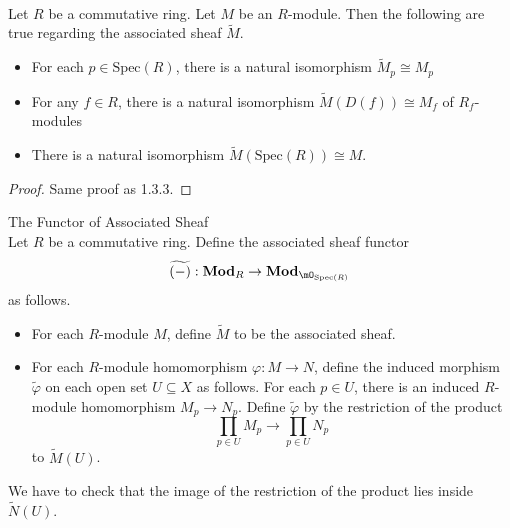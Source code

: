 \documentclass[a4paper]{article}
\begin{document}
\begin{prp}{}{}\\
Let $R$ be a commutative ring. Let $M$ be an $R$-module. Then the following are true regarding the associated sheaf $\widetilde{M}$. 
\begin{itemize}
\item For each $p\in\text{Spec}(R)$, there is a natural isomorphism $\widetilde{M}_p\cong M_p$
\item For any $f\in R$, there is a natural isomorphism $\widetilde{M}(D(f))\cong M_f$ of $R_f$-modules
\item There is a natural isomorphism $\widetilde{M}(\text{Spec}(R))\cong M$. 
\end{itemize}
\begin{proof}
Same proof as 1.3.3. 
\end{proof}
\end{prp}

\begin{defn}{The Functor of Associated Sheaf}{}\\
Let $R$ be a commutative ring. Define the associated sheaf functor $$\widetilde{(-)}:\bold{Mod}_R\to\bold{Mod}_{\mO_{\text{Spec}(R)}}$$ as follows. 
\begin{itemize}
\item For each $R$-module $M$, define $\widetilde{M}$ to be the associated sheaf. 
\item For each $R$-module homomorphism $\varphi:M\to N$, define the induced morphism $\widetilde{\varphi}$ on each open set $U\subseteq X$ as follows. For each $p\in U$, there is an induced $R$-module homomorphism $M_p\to N_p$. Define $\widetilde{\varphi}$ by the restriction of the product $$\prod_{p\in U}M_p\to\prod_{p\in U}N_p$$ to $\widetilde{M}(U)$. 
\end{itemize}
\end{defn}

We have to check that the image of the restriction of the product lies inside $\widetilde{N}(U)$. 
\end{document}
